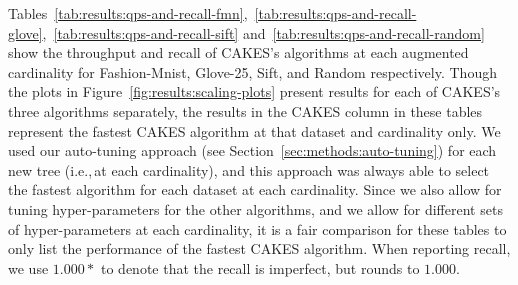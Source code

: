 Tables~\ref{tab:results:qps-and-recall-fmn},~\ref{tab:results:qps-and-recall-glove},~\ref{tab:results:qps-and-recall-sift} and~\ref{tab:results:qps-and-recall-random} show the throughput and recall of CAKES's algorithms at each augmented cardinality for Fashion-Mnist, Glove-25, Sift, and Random respectively.
Though the plots in Figure~\ref{fig:results:scaling-plots} present results for each of CAKES's three algorithms separately, the results in the CAKES column in these tables represent the fastest CAKES algorithm at that dataset and cardinality only.
We used our auto-tuning approach (see Section~\ref{sec:methods:auto-tuning}) for each new tree (i.e.,\,at each cardinality), and this approach was always able to select the fastest algorithm for each dataset at each cardinality.
Since we also allow for tuning hyper-parameters for the other algorithms, and we allow for different sets of hyper-parameters at each cardinality, it is a fair comparison for these tables to only list the performance of the fastest CAKES algorithm.
When reporting recall, we use $1.000*$ to denote that the recall is imperfect, but rounds to $1.000$.



